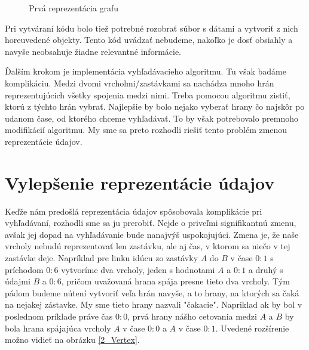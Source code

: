 \begin{figure}[H]
  \caption{Prvá reprezentácia grafu}
  \label{1_Graph}
\end{figure}

Pri vytváraní kódu bolo tiež potrebné rozobrať súbor s dátami a vytvoriť z nich horeuvedené objekty. Tento kód uvádzať nebudeme, nakoľko je dosť obsiahly a navyše neobsahuje žiadne relevantné informácie.\newline

Ďalším krokom je implementácia vyhľadávacieho algoritmu. Tu však badáme komplikáciu. Medzi dvomi vrcholmi/zastávkami sa nachádza mnoho hrán reprezentujúcich všetky spojenia medzi nimi. Treba pomocou algoritmu zistiť, ktorú z týchto hrán vybrať. Najlepšie by bolo nejako vyberať hrany čo najskôr po udanom čase, od ktorého chceme vyhľadávať. To by však potrebovalo premnoho modifikácií algoritmu. My sme sa preto rozhodli riešiť tento problém zmenou reprezentácie údajov.\newline


\section{Vylepšenie reprezentácie údajov}

Keďže nám predošlá reprezentácia údajov spôsobovala komplikácie pri vyhľadávaní, rozhodli sme sa ju prerobiť. Nejde o priveľmi signifikantnú zmenu, avšak jej dopad na vyhľadávanie bude nanajvýš uspokojujúci. Zmena je, že naše vrcholy nebudú reprezentovať len zastávku, ale aj čas, v ktorom sa niečo v tej zastávke deje. Napríklad pre linku idúcu zo zastávky $A$ do $B$ v čase $0:1$ s príchodom $0:6$ vytvoríme dva vrcholy, jeden s hodnotami $A$ a $0:1$ a druhý s údajmi $B$ a $0:6$, pričom uvažovaná hrana spája presne tieto dva vrcholy. Tým pádom budeme nútení vytvoriť veľa hrán navyše, a to hrany, na ktorých sa čaká na nejakej zástavke. My sme tieto hrany nazvali "čakacie". Napriklad ak by bol v poslednom príklade práve čas $0:0$, prvá hrany nášho cetovania medzi $A$ a $B$ by bola hrana spájajúca vrcholy $A$ v čase $0:0$ a $A$ v čase $0:1$. Uvedené rozšírenie možno vidieť na obrázku \ref{2_Vertex}.\newline

